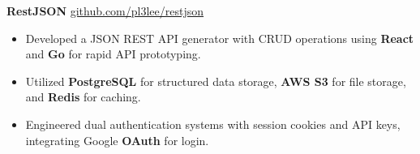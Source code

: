 \textbf{RestJSON} \hfill \href{https://github.com/pl3lee/restjson}{github.com/pl3lee/restjson} \\
\vspace{-9pt}
\begin{itemize}
  \item Developed a JSON REST API generator with CRUD operations using \textbf{React} and \textbf{Go} for rapid API prototyping.
  \item Utilized \textbf{PostgreSQL} for structured data storage, \textbf{AWS S3} for file storage, and \textbf{Redis} for caching.
  \item Engineered dual authentication systems with session cookies and API keys, integrating Google \textbf{OAuth} for login.
\end{itemize}